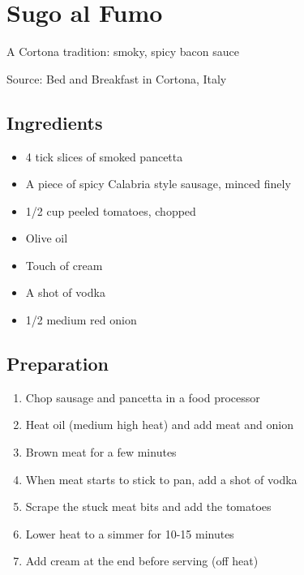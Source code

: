 \section{Sugo al Fumo}

\begin{center}
A Cortona tradition: smoky, spicy bacon sauce

\vspace{1em}

Source: Bed and Breakfast in Cortona, Italy
\end{center}

\subsection{Ingredients}
\begin{multicols}{2}
\begin{itemize}
    \item 4 tick slices of smoked pancetta
    \item A piece of spicy Calabria style sausage, minced finely
    \item 1/2 cup peeled tomatoes, chopped
    \item Olive oil
    \item Touch of cream
    \item A shot of vodka
    \item 1/2 medium red onion
\end{itemize}
\end{multicols}

\subsection{Preparation}
\begin{enumerate}
    \item Chop sausage and pancetta in a food processor
    \item Heat oil (medium high heat) and add meat and onion
    \item Brown meat for a few minutes
    \item When meat starts to stick to pan, add a shot of vodka
    \item Scrape the stuck meat bits and add the tomatoes
    \item Lower heat to a simmer for 10-15 minutes
    \item Add cream at the end before serving (off heat)
\end{enumerate}
